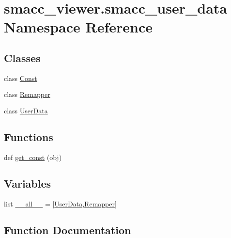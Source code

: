 \hypertarget{namespacesmacc__viewer_1_1smacc__user__data}{}\section{smacc\+\_\+viewer.\+smacc\+\_\+user\+\_\+data Namespace Reference}
\label{namespacesmacc__viewer_1_1smacc__user__data}
\subsection*{Classes}
\begin{DoxyCompactItemize}
\item 
class \hyperlink{classsmacc__viewer_1_1smacc__user__data_1_1Const}{Const}
\item 
class \hyperlink{classsmacc__viewer_1_1smacc__user__data_1_1Remapper}{Remapper}
\item 
class \hyperlink{classsmacc__viewer_1_1smacc__user__data_1_1UserData}{User\+Data}
\end{DoxyCompactItemize}
\subsection*{Functions}
\begin{DoxyCompactItemize}
\item 
def \hyperlink{namespacesmacc__viewer_1_1smacc__user__data_aca85c67e60fb6f052014a8584ba85d38}{get\+\_\+const} (obj)
\end{DoxyCompactItemize}
\subsection*{Variables}
\begin{DoxyCompactItemize}
\item 
list \hyperlink{namespacesmacc__viewer_1_1smacc__user__data_aeab8192696d125744891fa431706f5f9}{\+\_\+\+\_\+all\+\_\+\+\_\+} = \mbox{[}\textquotesingle{}\hyperlink{classsmacc__viewer_1_1smacc__user__data_1_1UserData}{User\+Data}\textquotesingle{},\textquotesingle{}\hyperlink{classsmacc__viewer_1_1smacc__user__data_1_1Remapper}{Remapper}\textquotesingle{}\mbox{]}
\end{DoxyCompactItemize}


\subsection{Function Documentation}
